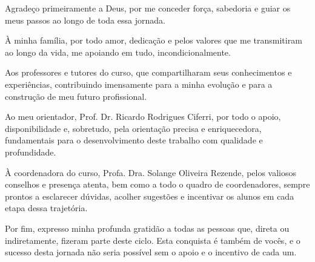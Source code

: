 \begin{agradecimentos}
Agradeço primeiramente a Deus, por me conceder força, sabedoria e guiar os meus passos ao longo de toda essa jornada.

À minha família, por todo amor, dedicação e pelos valores que me transmitiram ao longo da vida, me apoiando em tudo, incondicionalmente.

Aos professores e tutores do curso, que compartilharam seus conhecimentos e experiências, contribuindo imensamente para a minha evolução e para a construção de meu futuro profissional.

Ao meu orientador, Prof. Dr. Ricardo Rodrigues Ciferri, por todo o apoio, disponibilidade e, sobretudo, pela orientação precisa e enriquecedora, fundamentais para o desenvolvimento deste trabalho com qualidade e profundidade.

À coordenadora do curso, Profa. Dra. Solange Oliveira Rezende, pelos valiosos conselhos e presença atenta, bem como a todo o quadro de coordenadores, sempre prontos a esclarecer dúvidas, acolher sugestões e incentivar os alunos em cada etapa dessa trajetória.

Por fim, expresso minha profunda gratidão a todas as pessoas que, direta ou indiretamente, fizeram parte deste ciclo. Esta conquista é também de vocês, e o sucesso desta jornada não seria possível sem o apoio e o incentivo de cada um.
	
\end{agradecimentos}
